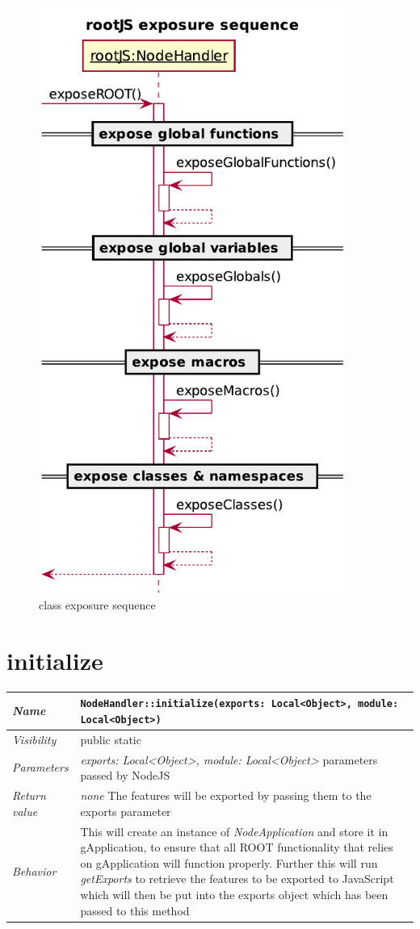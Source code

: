 \begin{figure}[H]
	\centering
	\includegraphics[width=10cm]{./latex/resources/exposureSequence.pdf}
	\caption{class exposure sequence}
\end{figure} \pagebreak
\section{initialize}
\begin{longtable}{p{3cm} @{\hskip 1cm} p{12cm}}
 \hline
\textit{Name} & \texttt{NodeHandler::initialize(exports: Local<Object>, module: Local<Object>)}\\
\hline
 \textit{Visibility} & public static\\
\hline
\textit{Parameters} & \textit{exports: Local<Object>, module: Local<Object>} parameters passed by NodeJS\\
\hline
\textit{Return value} & \textit{none} The features will be exported by passing them to the exports parameter \\
  \hline
 \textit{Behavior} & This will create an instance of \textit{NodeApplication} and store it in gApplication, to ensure that all ROOT functionality that relies on gApplication will function properly.
 Further this will run \textit{getExports} to retrieve the features to be exported to JavaScript which will then be put into the exports object which has been passed to this method \\
\hline
\end{longtable}
